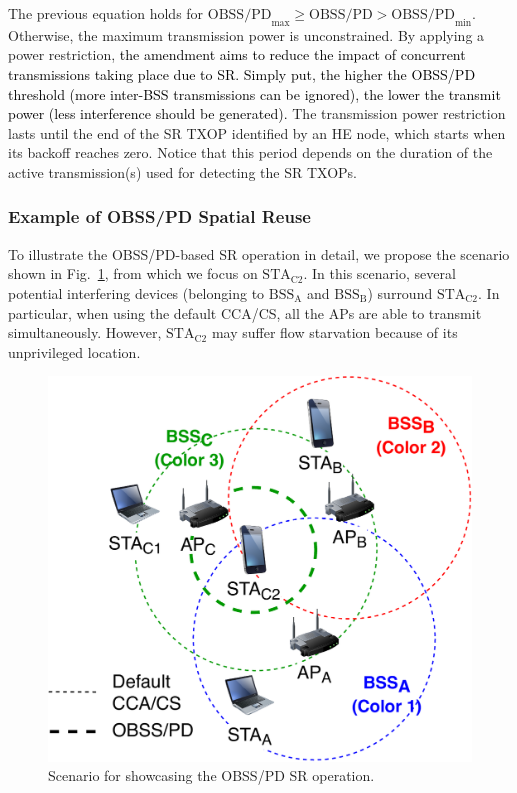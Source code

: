 \documentclass[preprint,12pt]{elsarticle}
\begin{document}
The previous equation holds for $\text{OBSS/PD}_{\max} \geq \text{OBSS/PD} > \text{OBSS/PD}_{\min}$. Otherwise, the maximum transmission power is unconstrained. By applying a power restriction, \textcolor{black}{the amendment aims to reduce the impact of concurrent transmissions taking place due to SR. Simply put, the higher the OBSS/PD threshold (more inter-BSS transmissions can be ignored), the lower the transmit power (less interference should be generated).} The transmission power restriction lasts until the end of the SR TXOP identified by an HE node, which starts when its backoff reaches zero. Notice that this period depends on the duration of the active transmission(s) used for detecting the SR TXOPs. 

\subsubsection{Example of OBSS/PD Spatial Reuse}
To illustrate the OBSS/PD-based SR operation in detail, we propose the scenario shown in Fig.~\ref{fig:fig_8_a}, from which we focus on $\text{STA}_\text{C2}$. In this scenario, several potential interfering devices (belonging to $\text{BSS}_\text{A}$ and $\text{BSS}_\text{B}$) surround $\text{STA}_\text{C2}$. In particular, when using the default CCA/CS, all the APs are able to transmit simultaneously. However, $\text{STA}_\text{C2}$ may suffer flow starvation because of its unprivileged location.
\begin{figure}[ht!]
	\centering
	\includegraphics[width=0.35\columnwidth]{fig_11}
	\caption{Scenario for showcasing the OBSS/PD SR operation.}
	\label{fig:fig_8_a}
\end{figure}
\end{document}
